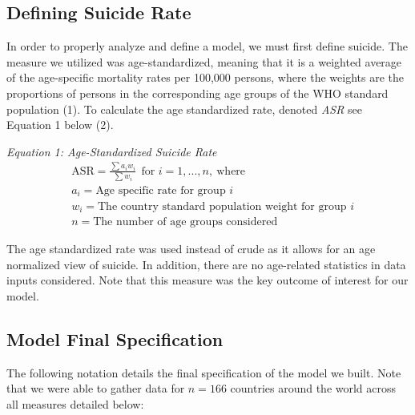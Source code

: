 \documentclass[]{article}
\begin{document}
\subsection{Defining Suicide Rate}\label{defining-suicide-rate}

In order to properly analyze and define a model, we must first define
suicide. The measure we utilized was age-standardized, meaning that it
is a weighted average of the age-specific mortality rates per 100,000
persons, where the weights are the proportions of persons in the
corresponding age groups of the WHO standard population (1). To
calculate the age standardized rate, denoted \emph{ASR} see Equation 1
below (2).

\emph{Equation 1: Age-Standardized Suicide Rate} \[
\begin{aligned}
& \text{ASR} = \frac{\sum{a_i w_i}}{\sum{w_i}} \ \ \text{for } i = 1,...,n,\ \text{where}\\
& a_i = \text{Age specific rate for group } i \\
& w_i = \text{The country standard population weight for group } i \\
& n = \text{The number of age groups considered}
\end{aligned}
\]

The age standardized rate was used instead of crude as it allows for an
age normalized view of suicide. In addition, there are no age-related
statistics in data inputs considered. Note that this measure was the key
outcome of interest for our model.

\subsection{Model Final Specification}\label{model-final-specification}

The following notation details the final specification of the model we
built. Note that we were able to gather data for \(n=166\) countries
around the world across all measures detailed below:
\end{document}
